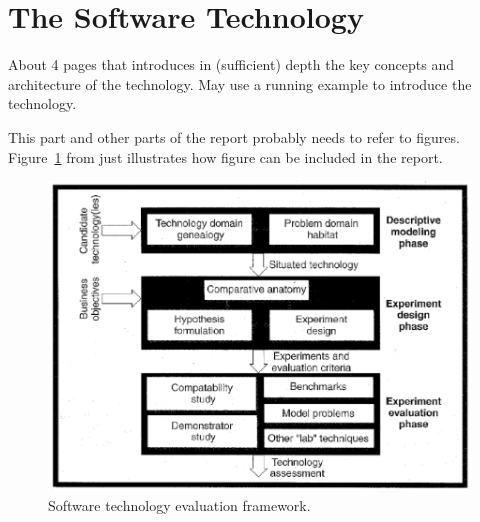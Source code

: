 \section{The Software Technology}
\label{sec:background}

About 4 pages that introduces in (sufficient) depth the key concepts
and architecture of the technology.  May use a running example to
introduce the technology.

This part and other parts of the report probably needs to refer to
figures. Figure~\ref{fig:framework} from \cite{brown:96} just
illustrates how figure can be included in the report.

\begin{figure}[h]
  \centering
  \includegraphics[scale=0.5]{figs/framework.png}
  \caption{Software technology evaluation framework.}
  \label{fig:framework}
\end{figure}
